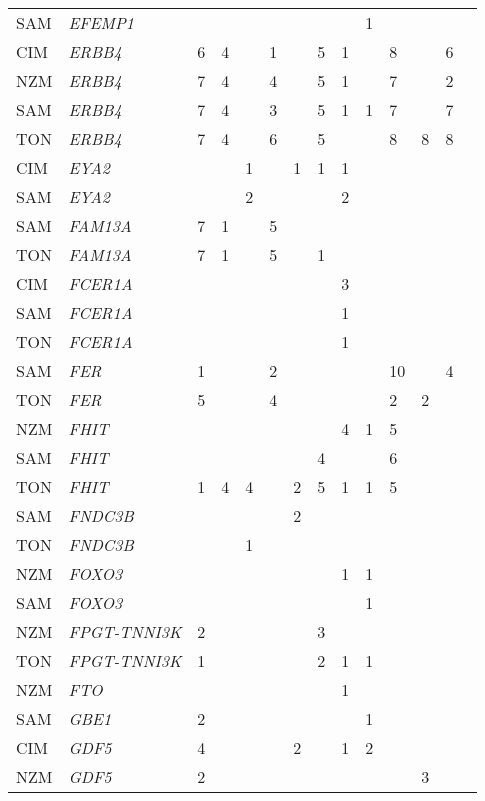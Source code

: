 \documentclass[twoside,openright]{report}
\begin{document}
\begin{ThreePartTable}
\begin{longtable}[t]{llllllllllllll}
SAM & \em{EFEMP1} &  &  &  &  &  &  &  & 1 &  &  &  & \\
CIM & \em{ERBB4} & 6 & 4 &  & 1 &  & 5 & 1 &  & 8 &  & 6 & \\
NZM & \em{ERBB4} & 7 & 4 &  & 4 &  & 5 & 1 &  & 7 &  & 2 & \\
SAM & \em{ERBB4} & 7 & 4 &  & 3 &  & 5 & 1 & 1 & 7 &  & 7 & \\
TON & \em{ERBB4} & 7 & 4 &  & 6 &  & 5 &  &  & 8 & 8 & 8 & \\
CIM & \em{EYA2} &  &  & 1 &  & 1 & 1 & 1 &  &  &  &  & \\
SAM & \em{EYA2} &  &  & 2 &  &  &  & 2 &  &  &  &  & \\
SAM & \em{FAM13A} & 7 & 1 &  & 5 &  &  &  &  &  &  &  & \\
TON & \em{FAM13A} & 7 & 1 &  & 5 &  & 1 &  &  &  &  &  & \\
CIM & \em{FCER1A} &  &  &  &  &  &  & 3 &  &  &  &  & \\
SAM & \em{FCER1A} &  &  &  &  &  &  & 1 &  &  &  &  & \\
TON & \em{FCER1A} &  &  &  &  &  &  & 1 &  &  &  &  & \\
SAM & \em{FER} & 1 &  &  & 2 &  &  &  &  & 10 &  & 4 & \\
TON & \em{FER} & 5 &  &  & 4 &  &  &  &  & 2 & 2 &  & \\
NZM & \em{FHIT} &  &  &  &  &  &  & 4 & 1 & 5 &  &  & \\
SAM & \em{FHIT} &  &  &  &  &  & 4 &  &  & 6 &  &  & \\
TON & \em{FHIT} & 1 & 4 & 4 &  & 2 & 5 & 1 & 1 & 5 &  &  & \\
SAM & \em{FNDC3B} &  &  &  &  & 2 &  &  &  &  &  &  & \\
TON & \em{FNDC3B} &  &  & 1 &  &  &  &  &  &  &  &  & \\
NZM & \em{FOXO3} &  &  &  &  &  &  & 1 & 1 &  &  &  & \\
SAM & \em{FOXO3} &  &  &  &  &  &  &  & 1 &  &  &  & \\
NZM & \em{FPGT-TNNI3K} & 2 &  &  &  &  & 3 &  &  &  &  &  & \\
TON & \em{FPGT-TNNI3K} & 1 &  &  &  &  & 2 & 1 & 1 &  &  &  & \\
NZM & \em{FTO} &  &  &  &  &  &  & 1 &  &  &  &  & \\
SAM & \em{GBE1} & 2 &  &  &  &  &  &  & 1 &  &  &  & \\
CIM & \em{GDF5} & 4 &  &  &  & 2 &  & 1 & 2 &  &  &  & \\
NZM & \em{GDF5} & 2 &  &  &  &  &  &  &  &  & 3 &  & \\

\end{longtable}
\end{ThreePartTable}
\end{document}
